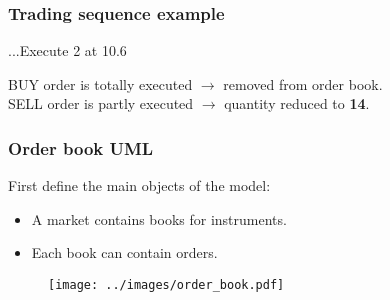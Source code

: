 \begin{frame}
\frametitle{Trading sequence example}
   ...Execute 2 at 10.6
   \begin{table}
      \centering
   \end{table}
   BUY order is totally executed $\rightarrow$ removed from order book. \\
   SELL order is partly executed $\rightarrow$ quantity reduced to {\bf 14}.
\end{frame}

\begin{frame}
\frametitle{Order book UML}
   \begin{minipage}{0.48\linewidth}
      First define the main objects of the model:
      \begin{itemize}
         \item A market contains books for instruments.
         \item Each book can contain orders.
      \end{itemize}
   \end{minipage}
   \begin{minipage}{0.48\linewidth}
      \begin{figure}
         \centering
         \texttt{[image: ../images/order\_book.pdf]}
      \end{figure}
   \end{minipage}
\end{frame}

